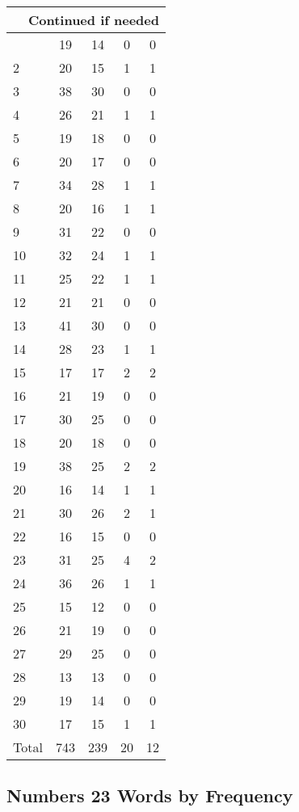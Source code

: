 \begin{center}
\begin{longtable}{l|c|c|c|c}
\hline \multicolumn{5}{|r|}{{Continued if needed}} \\ \hline
\endfoot 
1 & 19 & 14 & 0 & 0\\ \hline
2 & 20 & 15 & 1 & 1\\ \hline
3 & 38 & 30 & 0 & 0\\ \hline
4 & 26 & 21 & 1 & 1\\ \hline
5 & 19 & 18 & 0 & 0\\ \hline
6 & 20 & 17 & 0 & 0\\ \hline
7 & 34 & 28 & 1 & 1\\ \hline
8 & 20 & 16 & 1 & 1\\ \hline
9 & 31 & 22 & 0 & 0\\ \hline
10 & 32 & 24 & 1 & 1\\ \hline
11 & 25 & 22 & 1 & 1\\ \hline
12 & 21 & 21 & 0 & 0\\ \hline
13 & 41 & 30 & 0 & 0\\ \hline
14 & 28 & 23 & 1 & 1\\ \hline
15 & 17 & 17 & 2 & 2\\ \hline
16 & 21 & 19 & 0 & 0\\ \hline
17 & 30 & 25 & 0 & 0\\ \hline
18 & 20 & 18 & 0 & 0\\ \hline
19 & 38 & 25 & 2 & 2\\ \hline
20 & 16 & 14 & 1 & 1\\ \hline
21 & 30 & 26 & 2 & 1\\ \hline
22 & 16 & 15 & 0 & 0\\ \hline
23 & 31 & 25 & 4 & 2\\ \hline
24 & 36 & 26 & 1 & 1\\ \hline
25 & 15 & 12 & 0 & 0\\ \hline
26 & 21 & 19 & 0 & 0\\ \hline
27 & 29 & 25 & 0 & 0\\ \hline
28 & 13 & 13 & 0 & 0\\ \hline
29 & 19 & 14 & 0 & 0\\ \hline
30 & 17 & 15 & 1 & 1\\ \hline
Total & 743 & 239 & 20 & 12
\end{longtable}
\end{center}





\subsection{Numbers 23 Words by Frequency}


